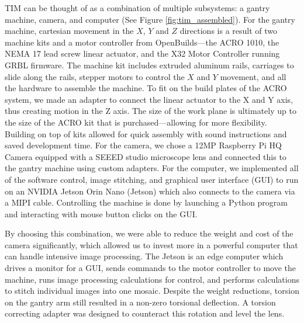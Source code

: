 \documentclass[a4paper,12pt]{article}
\begin{document}
TIM can be thought of as a combination of multiple subsystems: a gantry machine, camera, and computer (See Figure \ref{fig:tim_assembled}). 
For the gantry machine, cartesian movement in the $X$, $Y$ and $Z$ directions is a result of two machine kits and a motor controller from OpenBuilds---the ACRO 1010, the NEMA 17 lead screw linear actuator, and the X32 Motor Controller running GRBL firmware. 
The machine kit includes extruded aluminum rails, carriages to slide along the rails, stepper motors to control the $X$ and $Y$ movement, and all the hardware to assemble the machine. 
To fit on the build plates of the ACRO system, we made an adapter to connect the linear actuator to the X and Y axis, thus creating motion in the Z axis.
The size of the work plane is ultimately up to the size of the ACRO kit that is purchased---allowing for more flexibility.
Building on top of kits allowed for quick assembly with sound instructions and saved development time. 
For the camera, we chose a 12MP Raspberry Pi HQ Camera equipped with a SEEED studio microscope lens and connected this to the gantry machine using custom adapters.
For the computer, we implemented all of the software control, image stitching, and graphical user interface (GUI) to run on an NVIDIA Jetson Orin Nano (Jetson) which also connects to the camera via a MIPI cable.
Controlling the machine is done by launching a Python program and interacting with mouse button clicks on the GUI. 

By choosing this combination, we were able to reduce the weight and cost of the camera significantly, which allowed us to invest more in a powerful computer that can handle intensive image processing. 
The Jetson is an edge computer which drives a monitor for a GUI, sends commands to the motor controller to move the machine, runs image processing calculations for control, and performs calculations to stitch individual images into one mosaic. 
Despite the weight reductions, torsion on the gantry arm still resulted in a non-zero torsional deflection. A torsion correcting adapter was designed to counteract this rotation and level the lens.
\end{document}
